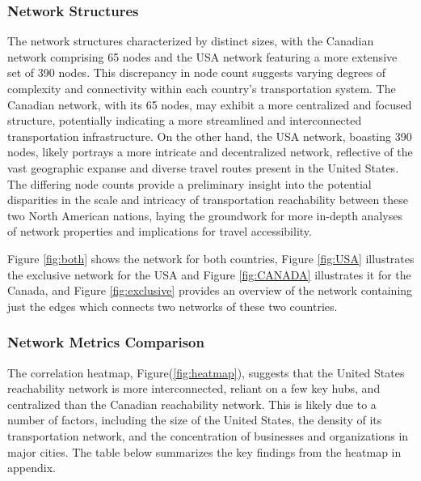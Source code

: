 \subsubsection{Network Structures}

The network structures characterized by distinct sizes, with the Canadian network comprising 65 nodes and the USA network featuring a more extensive set of 390 nodes. This discrepancy in node count suggests varying degrees of complexity and connectivity within each country's transportation system. The Canadian network, with its 65 nodes, may exhibit a more centralized and focused structure, potentially indicating a more streamlined and interconnected transportation infrastructure. On the other hand, the USA network, boasting 390 nodes, likely portrays a more intricate and decentralized network, reflective of the vast geographic expanse and diverse travel routes present in the United States. The differing node counts provide a preliminary insight into the potential disparities in the scale and intricacy of transportation reachability between these two North American nations, laying the groundwork for more in-depth analyses of network properties and implications for travel accessibility.

Figure \ref{fig:both} shows the network for both countries, Figure \ref{fig:USA} illustrates the exclusive network for the USA and Figure \ref{fig:CANADA} illustrates it for the Canada, and Figure \ref{fig:exclusive} provides an overview of the network containing just the edges which connects two networks of these two countries.

\subsubsection{Network Metrics Comparison}\label{metrics}
The correlation heatmap, Figure(\ref{fig:heatmap}), suggests that the United States reachability network is more interconnected, reliant on a few key hubs, and centralized than the Canadian reachability network. This is likely due to a number of factors, including the size of the United States, the density of its transportation network, and the concentration of businesses and organizations in major cities.
The table below summarizes the key findings from the heatmap in appendix.

